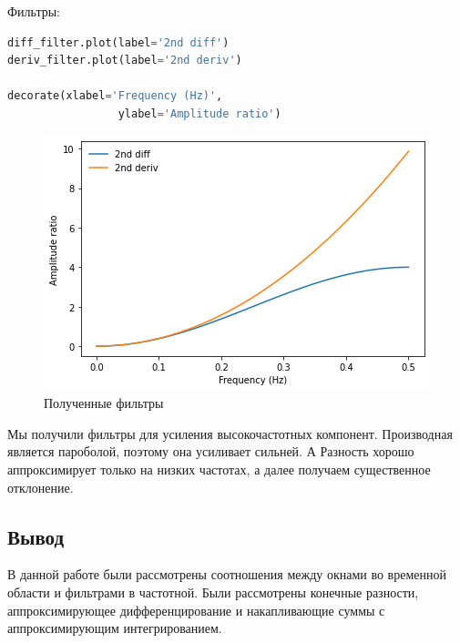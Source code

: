 Фильтры:
\begin{lstlisting}[language=Python]
diff_filter.plot(label='2nd diff')
deriv_filter.plot(label='2nd deriv')

decorate(xlabel='Frequency (Hz)',
                 ylabel='Amplitude ratio')
\end{lstlisting}

\begin{figure}[H]
	\begin{center}
		\includegraphics[scale=1]{fig/lab09/lab09_38_0.png}
		\caption{Полученные фильтры}
	\end{center}
\end{figure}

Мы получили фильтры для усиления высокочастотных компонент. Производная является пароболой, поэтому она усиливает сильней. А Разность хорошо аппроксимирует только на низких частотах, а далее получаем существенное отклонение.

\subsection{Вывод}

В данной работе были рассмотрены соотношения между окнами во временной области и фильтрами в частотной. Были рассмотрены конечные разности, аппроксимирующее дифференцирование и накапливающие суммы с аппроксимирующим интегрированием.